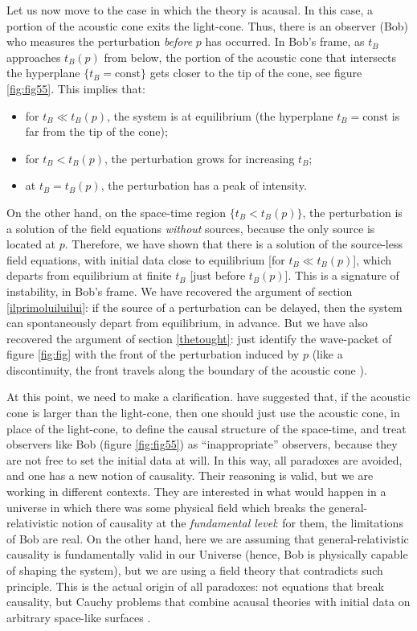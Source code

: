 \documentclass[a4paper, amsfonts, amssymb, amsmath, reprint, showkeys,  twoside, onecolumn,notitlepage,nofootinbib]{revtex4-1}
\theoremstyle{definition}
\theoremstyle{theorem}
\begin{document}
Let us now move to the case in which the theory is acausal. In this case, a portion of the acoustic cone exits the light-cone. Thus, there is an observer (Bob) who measures the perturbation \textit{before} $p$ has occurred. In Bob's frame, as $t_B$ approaches $t_B(p)$ from below, the portion of the acoustic cone that intersects the hyperplane $\{ t_B = \text{const} \}$ gets closer to the tip of the cone, see figure \ref{fig:fig55}. This implies that: 
\begin{itemize}
\item for $t_B \ll t_B(p)$, the system is at equilibrium (the hyperplane $t_B = \text{const}$ is far from the tip of the cone);
\item for $t_B < t_B(p)$, the perturbation grows for increasing $t_B$;
\item at $t_B = t_B(p)$, the perturbation has a peak of intensity.
\end{itemize}
On the other hand, on the space-time region $\{ t_B<t_B(p) \}$, the perturbation is a solution of the field equations \textit{without} sources, because the only source is located at $p$. Therefore, we have shown that there is a solution of the source-less field equations, with initial data close to equilibrium [for $t_B \ll t_B(p)$], which departs from equilibrium at finite $t_B$ [just before $t_B(p)$]. This is a signature of instability, in Bob's frame. We have recovered the argument of section \ref{ilprimoluiluilui}: if the source of a perturbation can be delayed, then the system can spontaneously depart from equilibrium, in advance. But we have also recovered the argument of section  \ref{thetought}: just identify the wave-packet of figure \ref{fig:fig} with the front of the perturbation induced by $p$ (like a discontinuity, the front travels along the boundary of the acoustic cone \cite{Hishcock1983}).



At this point, we need to make a clarification. \citet{kessence} have suggested that, if the acoustic cone is larger than the light-cone, then one should just use the acoustic cone, in place of the light-cone, to define the causal structure of the space-time, and treat observers like Bob (figure \ref{fig:fig55}) as ``inappropriate'' observers, because they are not free to set the initial data at will. In this way, all paradoxes are avoided, and one has a new notion of causality. Their reasoning is valid, but we are working in different contexts. They are interested in what would happen in a universe in which there was some physical field which breaks the general-relativistic notion of causality at the \textit{fundamental level}: for them, the limitations of Bob are real. On the other hand, here we are assuming that general-relativistic causality is fundamentally valid in our Universe (hence, Bob is physically capable of shaping the system), but we are using a field theory that contradicts such principle. This is the actual origin of all paradoxes: not equations that break causality, but Cauchy problems that combine acausal theories with initial data on arbitrary space-like surfaces \cite{Kost2000}.
\end{document}
